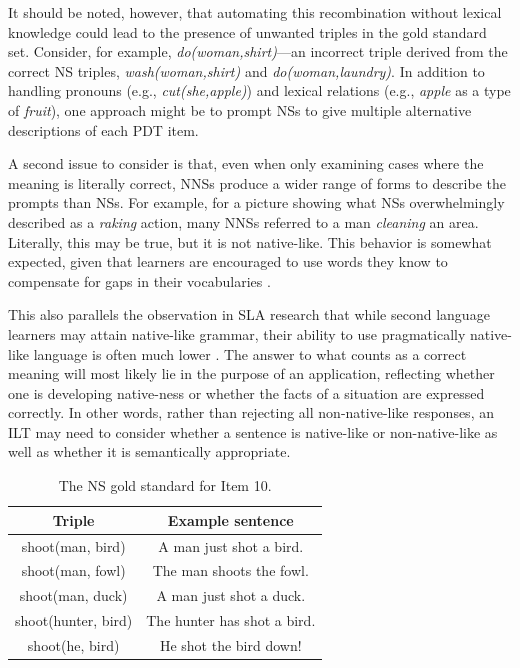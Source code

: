 It should be noted, however, that automating this recombination
without lexical knowledge could lead to the presence of unwanted
triples in the gold standard set.  Consider, for example,
\textit{do(woman,shirt)}---an incorrect triple derived from the
correct NS triples, \textit{wash(woman,shirt)} and
\textit{do(woman,laundry)}. In addition to handling pronouns (e.g.,
\textit{cut(she,apple)}) and lexical relations (e.g., \textit{apple}
as a type of \textit{fruit}), one approach might be to prompt NSs to
give multiple alternative descriptions of each PDT item.

A second issue to consider is that, even when only examining cases
where the meaning is literally correct, NNSs produce a wider range of
forms to describe the prompts than NSs.  For example, for a picture
showing what NSs overwhelmingly described as a \textit{raking} action,
many NNSs referred to a man \textit{cleaning} an area.  Literally,
this may be true, but it is not native-like. 
This behavior is somewhat expected, given that learners are encouraged
to use words they know to compensate for gaps in their vocabularies
\citep{AgustinLlach2010}.

This also parallels the observation in SLA research that while second
language learners may attain native-like grammar, their ability to use
pragmatically native-like language is often much lower
\citep{BardoviDornyei1998}.
The answer to what counts as a correct meaning will most likely lie in
the purpose of an application, reflecting whether one is developing
native-ness or whether the facts of a situation are expressed
correctly.
In other words, rather than rejecting all non-native-like responses,
an ILT may need to consider whether a sentence is native-like or
non-native-like as well as whether it is semantically appropriate.

\begin{table}[htb!]
\begin{center}
\begin{tabular}{|c|c|}
\hline
Triple & Example sentence \\
\hline
\hline
shoot(man, bird) & A man just shot a bird. \\
 \hline
shoot(man, fowl) & The man shoots the fowl. \\
 \hline
shoot(man, duck) & A man just shot a duck. \\
 \hline
shoot(hunter, bird) & The hunter has shot a bird. \\
 \hline
shoot(he, bird) & He shot the bird down! \\
 \hline
 \end{tabular}
\end{center}
\caption{The NS gold standard for Item 10.}
\label{tab:item10GS}
\end{table}


